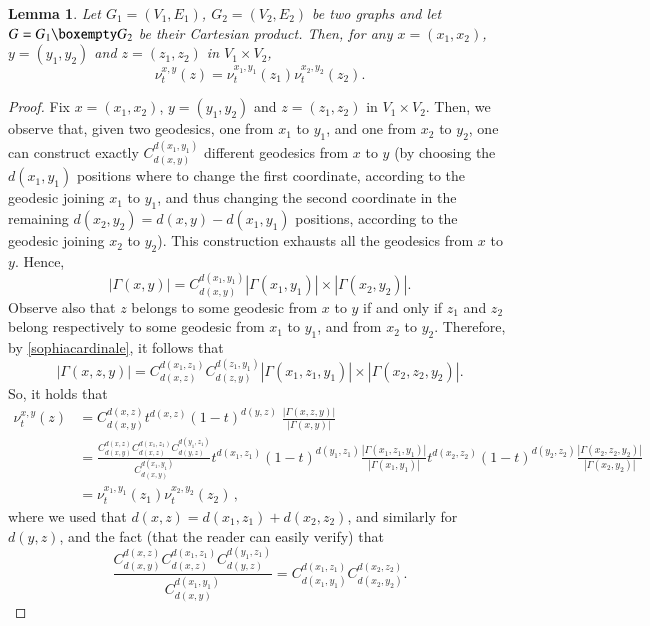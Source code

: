 \documentclass[11pt]{amsart}
\newtheorem{lem}[equation]{Lemma}
\numberwithin{equation}{section}
\begin{document}
\begin{lem} \label{tensor}
Let $G_1=(V_1,E_1)$, $G_2=(V_2,E_2)$ be two graphs and let $G=G_1 \boxempty G_2$ be their Cartesian product.
Then, for any $x=(x_1,x_2)$, $y=(y_1,y_2)$ and $z=(z_1,z_2)$ in $V_1 \times V_2$,
$$
\nu^{x,y}_t(z)=\nu^{x_1,y_1}_t(z_1)\nu^{x_2,y_2}_t(z_2).
$$
\end{lem}

\begin{proof}
Fix $x=(x_1,x_2)$, $y=(y_1,y_2)$ and $z=(z_1,z_2)$ in $V_1 \times V_2$. Then, we observe that, given two geodesics, one from $x_1$ to $y_1$, and one from $x_2$ to $y_2$, one can construct exactly $C_{d(x,y)}^{d(x_1,y_1)}$ different geodesics from $x$ to $y$ (by choosing the $d(x_1,y_1)$ positions where to change the first coordinate, according to the geodesic joining $x_1$ to $y_1$, and thus changing the second coordinate in the remaining $d(x_2,y_2)=d(x,y)-d(x_1,y_1)$ positions, according to the geodesic joining $x_2$ to $y_2$). This construction exhausts all the geodesics from $x$ to $y$. 
Hence,
\begin{equation}\label{eq:geod-prod}
|\Gamma(x,y)| = C_{d(x,y)}^{d(x_1,y_1)} |\Gamma(x_1,y_1)| \times  |\Gamma(x_2,y_2)|.
\end{equation}
Observe also that $z$ belongs to some geodesic from $x$ to $y$ if and only if $z_1$ and $z_2$ belong respectively to some geodesic from $x_1$ to $y_1$, and from $x_2$ to $y_2$. Therefore, by \eqref{sophiacardinale}, it follows that
$$|\Gamma(x,z,y)| = C_{d(x,z)}^{d(x_1,z_1)}C_{d(z,y)}^{d(z_1,y_1)}|\Gamma(x_1,z_1,y_1)| \times |\Gamma(x_2,z_2,y_2)|.$$
So, it holds that
\begin{align*}
\nu_t^{x,y}(z) & = C_{d(x,y)}^{d(x,z)} t^{d(x,z)} (1-t)^{d(y,z)}\; \frac{|\Gamma(x,z,y)| } {|\Gamma(x,y)|}    \\
& = 
\frac{C_{d(x,y)}^{d(x,z)} C_{d(x,z)}^{d(x_1,z_1)} C_{d(y,z)}^{d(y_1,z_1)} } {C_{d(x,y)}^{d(x_1,y_1)}} 
t^{d(x_1,z_1)} (1-t)^{d(y_1,z_1)} \frac{|\Gamma(x_1,z_1,y_1)| } {|\Gamma(x_1,y_1)|}
t^{d(x_2,z_2)} (1-t)^{d(y_2,z_2)} \frac{|\Gamma(x_2,z_2,y_2)|} {|\Gamma(x_2,y_2)|} 
\\
& =
\nu^{x_1,y_1}_t(z_1)\nu^{x_2,y_2}_t(z_2)\,,
\end{align*}
where we used that $d(x,z)=d(x_1,z_1)+d(x_2,z_2)$, and similarly for $d(y,z)$, and the fact (that the reader can easily verify) that
$$
\frac{C_{d(x,y)}^{d(x,z)} C_{d(x,z)}^{d(x_1,z_1)} C_{d(y,z)}^{d(y_1,z_1)} } {C_{d(x,y)}^{d(x_1,y_1)}} =
C_{d(x_1,y_1)}^{d(x_1,z_1)} C_{d(x_2,y_2)}^{d(x_2,z_2)} .
$$
\end{proof}
\end{document}
